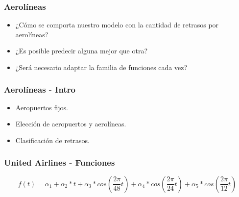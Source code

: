 \documentclass{beamer}
\begin{document}

\begin{frame}


\frametitle{Aerolíneas}

\begin{itemize}
    \item{¿Cómo se comporta nuestro modelo con la cantidad de retrasos por aerolíneas?}
    \item{¿Es posible predecir alguna mejor que otra?}
    \item{¿Será necesario adaptar la familia de funciones cada vez?}
\end{itemize}

\end{frame}


\begin{frame}


\frametitle{Aerolíneas - Intro}

\begin{itemize}
    \item{Aeropuertos fijos.}
    \item{Elección de aeropuertos y aerolíneas.}
    \item{Clasificación de retrasos.}
\end{itemize}

\end{frame}



\begin{frame}


\frametitle{United Airlines - Funciones}

$$ f(t) = \alpha_1 + \alpha_2 * t + \alpha_3 * cos(\frac{2\pi}{48} t) + \alpha_4 * cos(\frac{2\pi}{24} t) + \alpha_5 * cos(\frac{2\pi}{12} t) $$

\end{frame}


\end{document}
